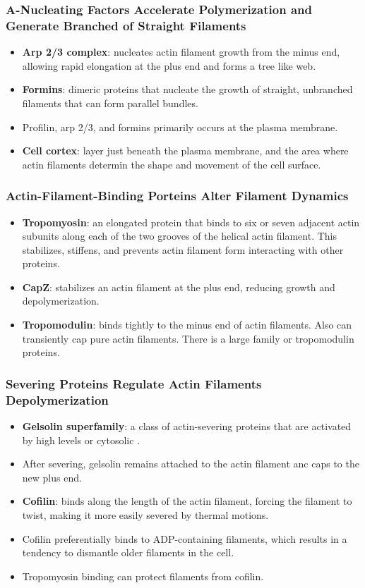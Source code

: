 \documentclass[12pt,a4paper]{article}
\begin{document}
\subsubsection{A-Nucleating Factors Accelerate Polymerization and Generate Branched of Straight Filaments}
\begin{itemize}
    \item \textbf{Arp 2/3 complex}: nucleates actin filament growth from the minus end, allowing rapid elongation at the plus end and forms a tree like web.
    \item \textbf{Formins}: dimeric proteins that nucleate the growth of straight, unbranched filaments that can form parallel bundles.
    \item Profilin, arp 2/3, and formins primarily occurs at the plasma membrane. 
    \item \textbf{Cell cortex}: layer just beneath the plasma membrane, and the area where actin filaments determin the shape and movement of the cell surface.
\end{itemize}

\subsubsection{Actin-Filament-Binding Porteins Alter Filament Dynamics}
\begin{itemize}
    \item \textbf{Tropomyosin}: an elongated protein that binds to six or seven adjacent actin subunits along each of the two grooves of the helical actin filament. This stabilizes, stiffens, and prevents actin filament form interacting with other proteins.
    \item \textbf{CapZ}: stabilizes an actin filament at the plus end, reducing growth and depolymerization. 
    \item \textbf{Tropomodulin}: binds tightly to the minus end of actin filaments. Also can transiently cap pure actin filaments. There is a large family or tropomodulin proteins.
\end{itemize}

\subsubsection{Severing Proteins Regulate Actin Filaments Depolymerization}
\begin{itemize}
    \item \textbf{Gelsolin superfamily}: a class of actin-severing proteins that are activated by high levels or cytosolic .
    \item After severing, gelsolin remains attached to the actin filament anc caps to the new plus end.
    \item \textbf{Cofilin}: binds along the length of the actin filament, forcing the filament to twist, making it more easily severed by thermal motions.
    \item Cofilin preferentially binds to ADP-containing filaments, which results in a tendency to dismantle older filaments in the cell.
    \item Tropomyosin binding can protect filaments from cofilin.
\end{itemize}
\end{document}
